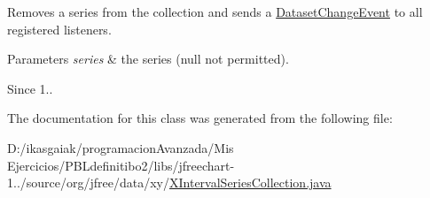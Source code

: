 Removes a series from the collection and sends a \mbox{\hyperlink{}{Dataset\+Change\+Event}} to all registered listeners.


\begin{DoxyParams}{Parameters}
{\em series} & the series ({\ttfamily null} not permitted).\\
\hline
\end{DoxyParams}
\begin{DoxySince}{Since}
1.. 
\end{DoxySince}


The documentation for this class was generated from the following file\+:\begin{DoxyCompactItemize}
\item 
D\+:/ikasgaiak/programacion\+Avanzada/\+Mis Ejercicios/\+P\+B\+Ldefinitibo2/libs/jfreechart-\/1../source/org/jfree/data/xy/\mbox{\hyperlink{_x_interval_series_collection_8java}{X\+Interval\+Series\+Collection.\+java}}\end{DoxyCompactItemize}
